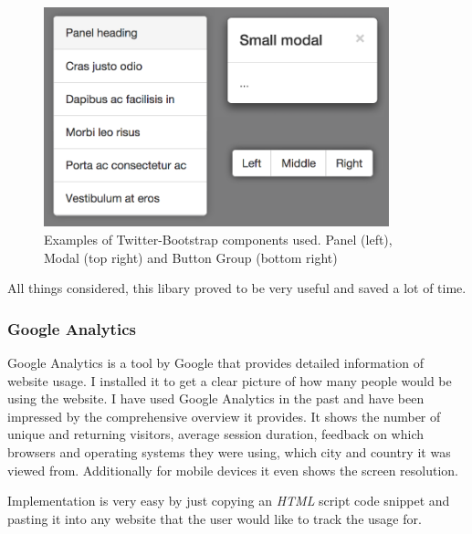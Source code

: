 \documentclass[a4paper,11pt,twoside]{article}
\begin{document}
\begin{figure}[ht!]
\centering
\includegraphics[width=100mm]{graphics/twitterBootstrap_01.png}
\caption{Examples of Twitter-Bootstrap components used. Panel (left), Modal (top right) and Button Group (bottom right)}
\label{fig:UIdesign1}
\end{figure}



All things considered, this libary proved to be very useful and saved a lot of time.




\subsubsection{Google Analytics}

Google Analytics is a tool by Google that provides detailed information of website usage. I installed it to get a clear picture of how many people would be using the website. I have used Google Analytics in the past and have been impressed by the comprehensive overview it provides. It shows the number of unique and returning visitors, average session duration, feedback on which browsers and operating systems they were using, which city and country it was viewed from. Additionally for mobile devices it even shows the screen resolution.

Implementation is very easy by just copying an \textit{HTML} script code snippet and pasting it into any website that the user would like to track the usage for.
\end{document}
